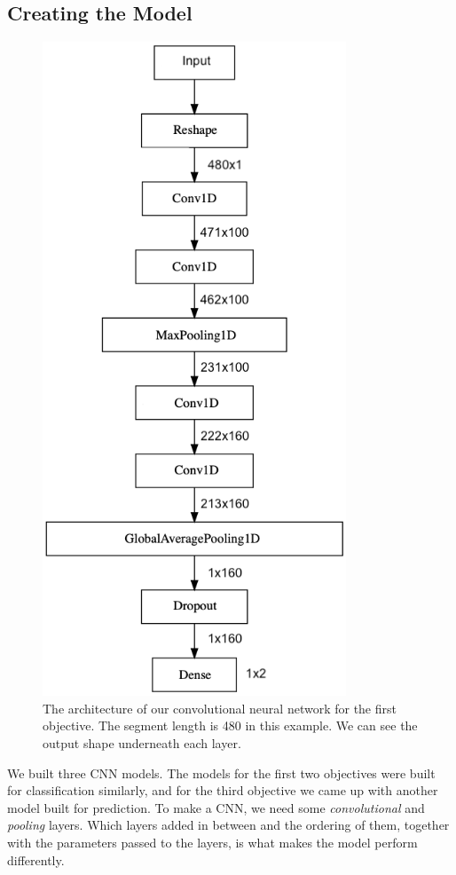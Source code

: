 \subsection{Creating the Model}
\begin{figure}[!ht]
\begin{center}
      \includegraphics[height=19.5cm]{img/layers.png}
      \caption{The architecture of our convolutional neural network for the first objective. The segment length is 480 in this example. We can see the output shape underneath each layer.}
      \label{figure:layers}
\end{center}
\end{figure}

We built three CNN models. The models for the first two objectives were built for classification similarly, and for the third objective we came up with another model built for prediction. To make a CNN, we need some \textit{convolutional} and \textit{pooling} layers. Which layers added in between and the ordering of them, together with the parameters passed to the layers, is what makes the model perform differently. 

